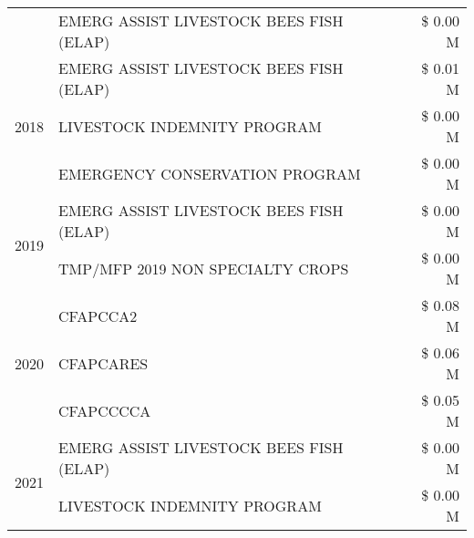 \begin{tabular}{llr}
 & EMERG ASSIST LIVESTOCK BEES FISH (ELAP) & \$ 0.00 M \\
\cline{1-3}
\multirow[t]{3}{*}{2018} & EMERG ASSIST LIVESTOCK BEES FISH (ELAP) & \$ 0.01 M \\
 & LIVESTOCK INDEMNITY PROGRAM & \$ 0.00 M \\
 & EMERGENCY CONSERVATION PROGRAM & \$ 0.00 M \\
\cline{1-3}
\multirow[t]{2}{*}{2019} & EMERG ASSIST LIVESTOCK BEES FISH (ELAP) & \$ 0.00 M \\
 & TMP/MFP 2019 NON SPECIALTY CROPS & \$ 0.00 M \\
\cline{1-3}
\multirow[t]{3}{*}{2020} & CFAPCCA2 & \$ 0.08 M \\
 & CFAPCARES & \$ 0.06 M \\
 & CFAPCCCCA & \$ 0.05 M \\
\cline{1-3}
\multirow[t]{2}{*}{2021} & EMERG ASSIST LIVESTOCK BEES FISH (ELAP) & \$ 0.00 M \\
 & LIVESTOCK INDEMNITY PROGRAM & \$ 0.00 M \\
\cline{1-3}
\bottomrule
\end{tabular}
